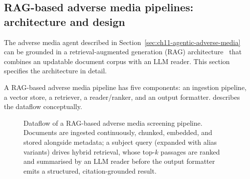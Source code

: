\subsection{RAG-based adverse media pipelines: architecture and design}
\label{sec:ch11-rag-adverse-media}

The adverse media agent described in Section~\ref{sec:ch11-agentic-adverse-media} can be grounded in a retrieval-augmented generation (RAG) architecture~\cite{lewis2020rag} that combines an updatable document corpus with an LLM reader. This section specifies the architecture in detail.

A RAG-based adverse media pipeline has five components: an ingestion pipeline, a vector store, a retriever, a reader/ranker, and an output formatter.  describes the dataflow conceptually.

\begin{figure}[htbp]
  \centering
  \caption{Dataflow of a RAG-based adverse media screening pipeline. Documents are
           ingested continuously, chunked, embedded, and stored alongside metadata; a
           subject query (expanded with alias variants) drives hybrid retrieval, whose
           top-$k$ passages are ranked and summarised by an LLM reader before the output
           formatter emits a structured, citation-grounded result.}
  \label{fig:ch11-rag-pipeline}
\end{figure}

